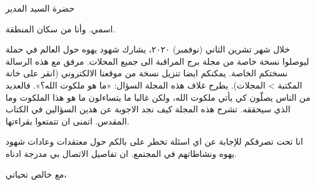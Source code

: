 حضرة السيد المدير

اسمي. وأنا من سكان المنطقة.

خلال شهر تشرين الثاني (نوفمبر) ٢٠٢٠، يشارك شهود يهوه حول العالم في حملة ليوصلوا نسخة خاصة من مجلة برج المراقبة الى جميع المحلات. مرفق مع هذه الرسالة نسختكم الخاصة. يمكنكم ايضا تنزيل نسخة من موقعنا الالكتروني  (انقر على خانة المكتبة > المجلات). يطرح غلاف هذه المجلة السؤال:‏ «ما هو ملكوت الله؟». فالعديد من الناس يصلّون كي يأتي ملكوت الله، ولكن غالبا ما يتساءلون ما هو هذا الملكوت وما الذي سيحققه. تشرح هذه المجلة كيف نجد الاجوبة عن هذين السؤالين في الكتاب المقدس. اتمنى ان تتمتعوا بقراءتها.  

انا تحت تصرفكم للإجابة عن اي اسئلة تخطر على بالكم حول معتقدات وعادات شهود يهوه ونشاطاتهم في المجتمع. ان تفاصيل الاتصال بي مدرجة ادناه. 

مع خالص تحياتي،
